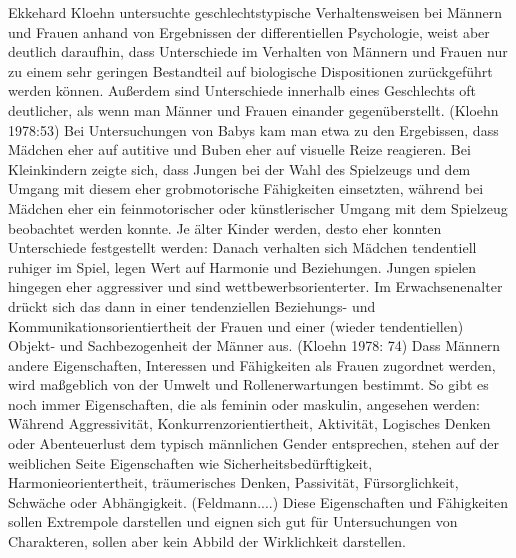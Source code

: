 Ekkehard Kloehn untersuchte geschlechtstypische Verhaltensweisen bei Männern und Frauen anhand von Ergebnissen der differentiellen Psychologie, weist aber deutlich daraufhin, dass Unterschiede im Verhalten von Männern und Frauen nur zu einem sehr geringen Bestandteil auf biologische Dispositionen zurückgeführt werden können. Außerdem sind Unterschiede innerhalb eines Geschlechts oft deutlicher, als wenn man Männer und Frauen einander gegenüberstellt. (Kloehn 1978:53) 
Bei Untersuchungen von Babys kam man etwa zu den Ergebissen, dass Mädchen eher auf autitive und Buben eher auf visuelle Reize reagieren. Bei Kleinkindern zeigte sich, dass Jungen bei der Wahl des Spielzeugs und dem Umgang mit diesem eher grobmotorische Fähigkeiten einsetzten, während bei Mädchen eher ein feinmotorischer oder künstlerischer Umgang mit dem Spielzeug beobachtet werden konnte. Je älter Kinder werden, desto eher konnten Unterschiede festgestellt werden: Danach verhalten sich Mädchen tendentiell ruhiger im Spiel, legen Wert auf Harmonie und Beziehungen. Jungen spielen hingegen eher aggressiver und sind wettbewerbsorienterter. Im Erwachsenenalter drückt sich das dann in einer tendenziellen Beziehungs- und Kommunikationsorientiertheit der Frauen und einer (wieder tendentiellen) Objekt- und Sachbezogenheit der Männer aus. (Kloehn 1978: 74) Dass Männern andere Eigenschaften, Interessen und Fähigkeiten als Frauen zugordnet werden, wird maßgeblich von der Umwelt und Rollenerwartungen bestimmt. So gibt es noch immer Eigenschaften, die als feminin oder maskulin, angesehen werden: Während Aggressivität, Konkurrenzorientiertheit, Aktivität, Logisches Denken oder Abenteuerlust dem typisch männlichen Gender entsprechen, stehen auf der weiblichen Seite Eigenschaften wie Sicherheitsbedürftigkeit, Harmonieorientertheit, träumerisches Denken, Passivität, Fürsorglichkeit, Schwäche oder Abhängigkeit. (Feldmann....) Diese Eigenschaften und Fähigkeiten sollen Extrempole darstellen und eignen sich gut für Untersuchungen von Charakteren, sollen aber kein Abbild der Wirklichkeit darstellen.

